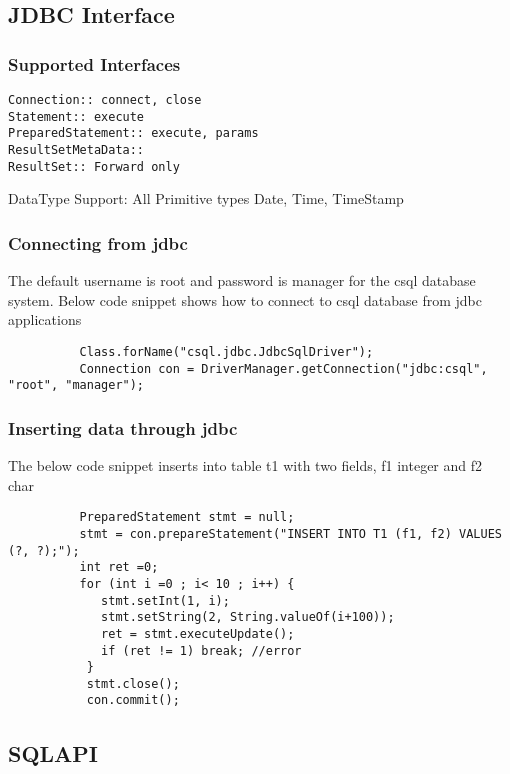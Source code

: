 \documentclass[12pt]{article}
\begin{document}
\subsection{JDBC Interface }
\label{JDBC Interface }
\subsubsection{Supported Interfaces}
\label{supportedInterfaces}
\begin{verbatim}
Connection:: connect, close
Statement:: execute
PreparedStatement:: execute, params
ResultSetMetaData::
ResultSet:: Forward only
\end{verbatim}


DataType Support:
All Primitive types
Date, Time, TimeStamp

\subsubsection{Connecting from jdbc}
\label{jdbcconnect}
The default username is root and password is manager for the csql database system. Below code snippet shows how to connect to csql database from jdbc applications \\
\begin{verbatim}
          Class.forName("csql.jdbc.JdbcSqlDriver");
          Connection con = DriverManager.getConnection("jdbc:csql", "root", "manager");
\end{verbatim}

\subsubsection{Inserting data through jdbc}
\label{jdbcinsert}
 The below code snippet inserts into table t1 with two fields, f1 integer and f2 char \\
\begin{verbatim}
          PreparedStatement stmt = null;
          stmt = con.prepareStatement("INSERT INTO T1 (f1, f2) VALUES (?, ?);");
          int ret =0;
          for (int i =0 ; i< 10 ; i++) {
             stmt.setInt(1, i);
             stmt.setString(2, String.valueOf(i+100));
             ret = stmt.executeUpdate();
             if (ret != 1) break; //error
           }
           stmt.close();
           con.commit();
\end{verbatim}

\subsection{SQLAPI }
\label{SQLAPI }
\end{document}
